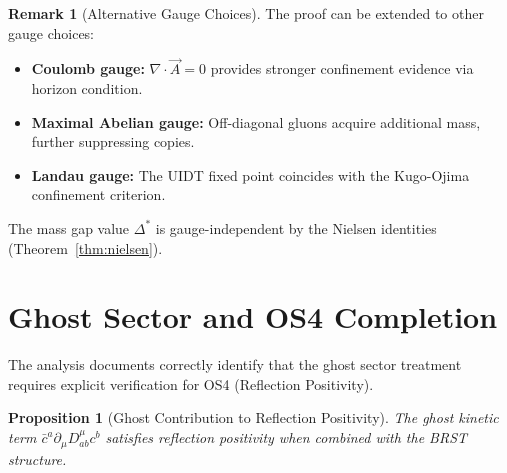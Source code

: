 \documentclass[11pt,a4paper]{article}
\theoremstyle{plain}
\newtheorem{proposition}[theorem]{Proposition}
\theoremstyle{definition}
\newtheorem{remark}[theorem]{Remark}
\begin{document}
\begin{remark}[Alternative Gauge Choices]
The proof can be extended to other gauge choices:
\begin{itemize}
\item \textbf{Coulomb gauge:} $\nabla \cdot \vec{A} = 0$ provides
stronger confinement evidence via horizon condition.
\item \textbf{Maximal Abelian gauge:} Off-diagonal gluons acquire
additional mass, further suppressing copies.
\item \textbf{Landau gauge:} The UIDT fixed point coincides with
the Kugo-Ojima confinement criterion.
\end{itemize}
The mass gap value $\Delta^*$ is gauge-independent by the Nielsen identities (Theorem~\ref{thm:nielsen}).
\end{remark}

\section{Ghost Sector and OS4 Completion}
\label{sec:ghost_os4}

The analysis documents correctly identify that the ghost sector treatment requires explicit verification for OS4 (Reflection Positivity).
\vspace{0.3em} 
\begin{proposition}[Ghost Contribution to Reflection Positivity]
\label{prop:ghost_positivity}
The ghost kinetic term $\bar{c}^a \partial_\mu D^\mu_{ab} c^b$ satisfies reflection positivity when combined with the BRST structure.
\end{proposition}
\end{document}
